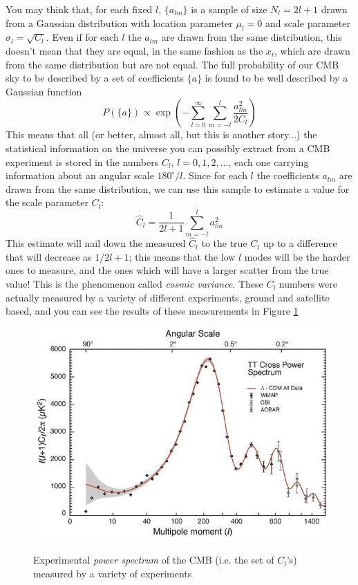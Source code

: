 \documentclass[11pt, a4paper,oneside,openright]{book}
\numberwithin{equation}{section}
\begin{document}
You may think that, for each fixed $l$, $\{a_{lm}\}$ is a sample of size $N_l=2l+1$ drawn from a Gaussian distribution with location parameter $\mu_l=0$ and scale parameter $\sigma_l=\sqrt{C_l}$. Even if for each $l$ the $a_{lm}$ are drawn from the same distribution, this doesn't mean that they are equal, in the same fashion as the $x_i$, which are drawn from the same distribution but are not equal. The full probability of our CMB sky to be described by a set of coefficients $\{a\}$ is found to be well described by a Gaussian function
\begin{equation}
P(\{a\})\propto \exp{\left(-\sum_{l=0}^\infty\sum_{m=-l}^l\frac{a_{lm}^2}{2C_l}\right)}
\end{equation}
This means that all (or better, almost all, but this is another story...) the statistical information on the universe you can possibly extract from a CMB experiment is stored in the numbers $C_l$, $l=0,1,2,...$, each one carrying information about an angular scale $180^\circ/l$. Since for each $l$ the coefficients $a_{lm}$ are drawn from the same distribution, we can use this sample to estimate a value for the scale parameter $C_l$:
\begin{equation}
\hat{C}_l=\frac{1}{2l+1}\sum_{m=-l}^la^2_{lm}
\end{equation} 
%
This estimate will nail down the measured $\hat{C}_l$ to the true $C_l$ up to a difference that will decrease as $1/2l+1$; this means that the low $l$ modes will be the harder ones to measure, and the ones which will have a larger scatter from the true value! This is the phenomenon called \textit{cosmic variance}. These $C_l$ numbers were actually measured by a variety of different experiments, ground and satellite based, and you can see the results of these measurements in Figure \ref{exppower}
\begin{figure}
\begin{center}
\includegraphics[scale=0.7]{CMB/exp_power}
\label{}
\end{center}
\caption{Experimental \textit{power spectrum} of the CMB (i.e. the set of $C_l$'s) measured by a variety of experiments}
\label{exppower}
\end{figure}
\end{document}

